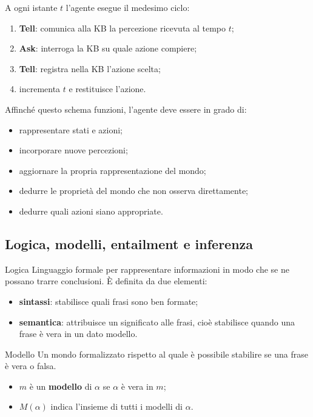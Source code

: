 \documentclass[11pt, a4paper]{article}
\begin{document}
A ogni istante $t$ l'agente esegue il medesimo ciclo:
\begin{enumerate}
  \item \textbf{Tell}: comunica alla KB la percezione ricevuta al tempo $t$;
  \item \textbf{Ask}: interroga la KB su quale azione compiere;
  \item \textbf{Tell}: registra nella KB l'azione scelta;
  \item incrementa $t$ e restituisce l'azione.
\end{enumerate}

Affinché questo schema funzioni, l'agente deve essere in grado di:
\begin{itemize}
  \item rappresentare stati e azioni;
  \item incorporare nuove percezioni;
  \item aggiornare la propria rappresentazione del mondo;
  \item dedurre le proprietà del mondo che non osserva direttamente;
  \item dedurre quali azioni siano appropriate.
\end{itemize}

\subsection{Logica, modelli, entailment e inferenza}

\begin{defbox}{Logica}
  Linguaggio formale per rappresentare informazioni in modo che se ne possano trarre conclusioni. È definita da due elementi:
  \begin{itemize}
    \item \textbf{sintassi}: stabilisce quali frasi sono ben formate;
    \item \textbf{semantica}: attribuisce un significato alle frasi, cioè stabilisce quando una frase è vera in un dato modello.
  \end{itemize}
\end{defbox}

\begin{defbox}{Modello}
  Un mondo formalizzato rispetto al quale è possibile stabilire se una frase è vera o falsa.
  \begin{itemize}
    \item $m$ è un \textbf{modello} di $\alpha$ se $\alpha$ è vera in $m$;
    \item $M(\alpha)$ indica l'insieme di tutti i modelli di $\alpha$.
  \end{itemize}
\end{defbox}
\end{document}
